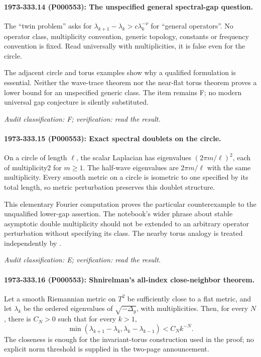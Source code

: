 \paragraph{1973-333.14 (P000553): The unspecified general spectral-gap question.}
The “twin problem” asks for \(\lambda_{k+1}-\lambda_k>c\lambda_k^{-\nu}\) for “general operators”. No operator class, multiplicity convention, generic topology, constants or frequency convention is fixed. Read universally with multiplicities, it is false even for the circle.

The adjacent circle and torus examples show why a qualified formulation is essential. Neither the wave-trace theorem nor the near-flat torus theorem proves a lower bound for an unspecified generic class. The item remains F; no modern universal gap conjecture is silently substituted.

\emph{Audit classification: F; verification: read the result.}

\paragraph{1973-333.15 (P000553): Exact spectral doublets on the circle.}
On a circle of length \(\ell\), the scalar Laplacian has eigenvalues \((2\pi m/\ell)^2\), each of multiplicity2 for \(m\ge1\). The half-wave eigenvalues are \(2\pi m/\ell\) with the same multiplicity. Every smooth metric on a circle is isometric to one specified by its total length, so metric perturbation preserves this doublet structure.

This elementary Fourier computation proves the particular counterexample to the unqualified lower-gap assertion. The notebook’s wider phrase about stable asymptotic double multiplicity should not be extended to an arbitrary operator perturbation without specifying its class. The nearby torus analogy is treated independently by \citet{shnirelman1975multiplicity}.

\emph{Audit classification: E; verification: read the result.}

\paragraph{1973-333.16 (P000553): Shnirelman’s all-index close-neighbor theorem.}
Let a smooth Riemannian metric on \(T^2\) be sufficiently close to a flat metric, and let \(\lambda_k\) be the ordered eigenvalues of \(\sqrt{-\Delta_g}\), with multiplicities. Then, for every \(N\), there is \(C_N>0\) such that for every \(k>1\), \[\min(\lambda_{k+1}-\lambda_k,\lambda_k-\lambda_{k-1})<C_N k^{-N}.\] The closeness is enough for the invariant-torus construction used in the proof; no explicit norm threshold is supplied in the two-page announcement.

